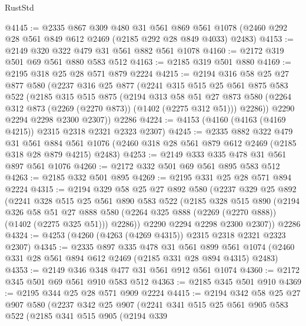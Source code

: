 \begin{lexlean}{RustStd}
\begin{coremodule}
@4145 := @2335
    @867
    @309
    @480
    @31
    @561
    @869
    @561
    @1078
    (@2460 @292 @28 @561 @849 @612 @2469 (@2185 @292 @28 @849 @4033) @2483)
@4153 := @2149 @320 @322 @479 @31 @561 @882 @561 @1078
@4160 := @2172 @319 @501 @69 @561 @880 @583 @512
@4163 := @2185 @319 @501 @880
@4169 := @2195 @318 @25 @28 @571 @879 @2224
@4215 := @2194
    @316
    @58
    @25
    @27
    @877
    @580
    (@2237
      @316
      @25
      @877
      (@2241
        @315
        @515
        @25
        @561
        @875
        @583
        @522
        (@2185
          @315
          @515
          @875
          (@2194
            @313
            @58
            @51
            @27
            @873
            @580
            (@2264 @312 @873 (@2269 (@2270 @873)) (@1402 (@2275 @312 @51)))
            @2286))
        @2290
        @2294
        @2298
        @2300
        @2307))
    @2286
@4224 := @4153 (@4160 (@4163 (@4169 @4215)) @2315 @2318 @2321 @2323 @2307)
@4245 := @2335
    @882
    @322
    @479
    @31
    @561
    @884
    @561
    @1076
    (@2460 @318 @28 @561 @879 @612 @2469 (@2185 @318 @28 @879 @4215) @2483)
@4253 := @2149 @333 @335 @478 @31 @561 @897 @561 @1076
@4260 := @2172 @332 @501 @69 @561 @895 @583 @512
@4263 := @2185 @332 @501 @895
@4269 := @2195 @331 @25 @28 @571 @894 @2224
@4315 := @2194
    @329
    @58
    @25
    @27
    @892
    @580
    (@2237
      @329
      @25
      @892
      (@2241
        @328
        @515
        @25
        @561
        @890
        @583
        @522
        (@2185
          @328
          @515
          @890
          (@2194
            @326
            @58
            @51
            @27
            @888
            @580
            (@2264 @325 @888 (@2269 (@2270 @888)) (@1402 (@2275 @325 @51)))
            @2286))
        @2290
        @2294
        @2298
        @2300
        @2307))
    @2286
@4324 := @4253 (@4260 (@4263 (@4269 @4315)) @2315 @2318 @2321 @2323 @2307)
@4345 := @2335
    @897
    @335
    @478
    @31
    @561
    @899
    @561
    @1074
    (@2460 @331 @28 @561 @894 @612 @2469 (@2185 @331 @28 @894 @4315) @2483)
@4353 := @2149 @346 @348 @477 @31 @561 @912 @561 @1074
@4360 := @2172 @345 @501 @69 @561 @910 @583 @512
@4363 := @2185 @345 @501 @910
@4369 := @2195 @344 @25 @28 @571 @909 @2224
@4415 := @2194
    @342
    @58
    @25
    @27
    @907
    @580
    (@2237
      @342
      @25
      @907
      (@2241
        @341
        @515
        @25
        @561
        @905
        @583
        @522
        (@2185
          @341
          @515
          @905
          (@2194
            @339

\end{coremodule}
\end{lexlean}

